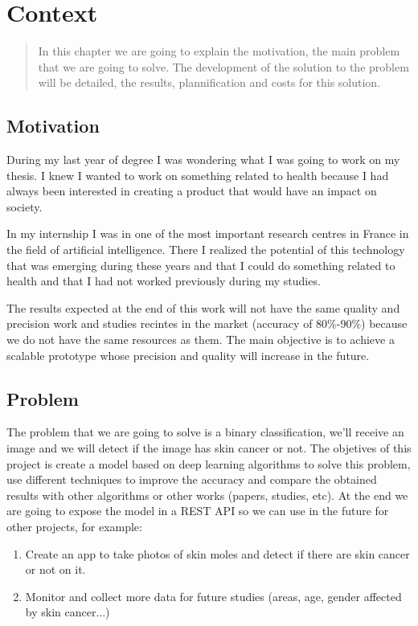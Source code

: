 \chapter{Context}

\begin{abstract}
In this chapter we are going to explain the motivation, the main problem that we are going to solve. The development of the solution to the problem will be detailed, the results, plannification and costs for this solution.
\end{abstract}

\section[Motivation]{Motivation}

During my last year of degree I was wondering what I was going to work on my thesis. I knew I wanted to work on something related to health because I had always been interested in creating a product that would have an impact on society. 

In my internship I was in one of the most important research centres in France in the field of artificial intelligence. There I realized the potential of this technology that was emerging during these years and that I could do something related to health and that I had not worked previously during my studies.

The results expected at the end of this work will not have the same quality and precision work and studies recintes in the market (accuracy of 80\%-90\%) because we do not have the same resources as them. The main objective is to achieve a scalable prototype whose precision and quality will increase in the future.


\section[Problem]{Problem}
The problem that we are going to solve is a binary classification, we'll receive an image and we will detect if the image has skin cancer or not.
The objetives of this project is create a model based on deep learning algorithms to solve this problem, use different techniques to improve the accuracy and compare the obtained results with other algorithms or other works (papers, studies, etc). At the end we are going to expose the model in a REST API so we can use in the future for other projects, for example:

\begin{enumerate}
\item Create an app to take photos of skin moles and detect if there are skin cancer or not on it.
\item Monitor and collect more data for future studies (areas, age, gender affected by skin cancer...)
\end{enumerate}

